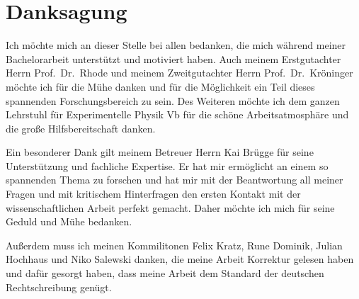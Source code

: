 \chapter{Danksagung}
Ich möchte mich an dieser Stelle bei allen bedanken, die mich während meiner Bachelorarbeit unterstützt und motiviert haben.
Auch meinem Erstgutachter Herrn Prof.~Dr.~Rhode und meinem Zweitgutachter Herrn Prof.~Dr.~Kröninger möchte ich für die Mühe danken
und für die Möglichkeit ein Teil dieses spannenden Forschungsbereich zu sein. Des Weiteren möchte ich dem ganzen Lehrstuhl für
Experimentelle Physik Vb für die schöne Arbeitsatmosphäre und die große Hilfsbereitschaft danken.

Ein besonderer Dank gilt meinem Betreuer Herrn Kai Brügge für seine Unterstützung und fachliche Expertise. Er hat mir ermöglicht
an einem so spannenden Thema zu forschen und hat mir mit der Beantwortung all meiner Fragen und mit kritischem Hinterfragen den
ersten Kontakt mit der wissenschaftlichen Arbeit perfekt gemacht. Daher möchte ich mich für seine Geduld und Mühe bedanken.

Außerdem muss ich meinen Kommilitonen Felix Kratz, Rune Dominik, Julian Hochhaus und Niko Salewski danken, die meine Arbeit Korrektur gelesen haben und dafür gesorgt
haben, dass meine Arbeit dem Standard der deutschen Rechtschreibung genügt.
